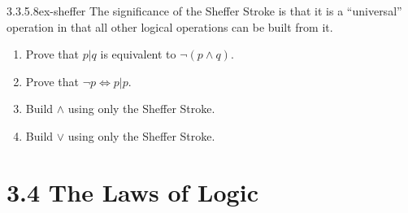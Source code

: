 \documentclass[twoside,10pt,]{book}
\numberwithin{equation}{section}
\begin{document}
\begin{divisionsolution}{3.3.5.8}{}{ex-sheffer}%
\hypertarget{p-1045}{}%
The significance of the Sheffer Stroke is that it is a ``universal'' operation in that all other logical operations can be built from it.\leavevmode%
\begin{enumerate}[label=(\alph*)]
\item\hypertarget{li-575}{}\hypertarget{p-1046}{}%
Prove that \(p | q\) is equivalent to \(\neg (p \land  q)\).%
\item\hypertarget{li-576}{}\hypertarget{p-1047}{}%
Prove that \(\neg p \Leftrightarrow  p | p\).%
\item\hypertarget{li-577}{}\hypertarget{p-1048}{}%
Build \(\land\) using only the Sheffer Stroke.%
\item\hypertarget{li-578}{}\hypertarget{p-1049}{}%
Build \(\lor\) using only the Sheffer Stroke.%
\end{enumerate}
%
\end{divisionsolution}%
\section*{3.4 The Laws of Logic}
\end{document}
